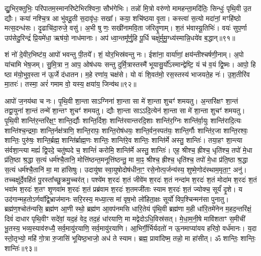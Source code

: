 द्यु॒भिर॒क्तुभिः॒ परि॑पातम॒स्मानरि॑ष्टेभिरश्विना॒ सौभ॑गेभिः। 
तन्नो॑ मि॒त्रो वरु॑णो मामहन्ता॒मदि॑तिः॒ सिन्धुः॑ पृथि॒वी उ॒त द्यौः। 
कया॑ नश्चि॒त्र आ भु॑वदू॒ती स॒दावृ॑धः॒ सखा᳚। 
कया॒ शचि॑ष्ठया वृ॒ता। 
कस्त्वा॑ स॒त्यो मदा॑नां॒ मꣳहि॑ष्ठो मत्स॒दन्ध॑सः। 
दृ॒ढाचि॑दा॒रुजे॒ वसु॑। 
अ॒भी षु णः॒ सखी॑नामवि॒ता ज॑रितॄ॒णाम्। 
श॒तं भ॑वास्यू॒तिभिः॑। 
वयः॑ सुप॒र्णा उप॑सेदु॒रिन्द्रं॑ प्रि॒यमे॑धा॒ ऋष॑यो॒ नाध॑मानाः। 
अप॑ ध्वा॒न्तमू᳚र्णु॒हि पू॒र्धि चक्षु॑र्मुमु॒ग्ध्य॑स्मान्नि॒धये॑व ब॒द्धान्॥९१॥

शं नो॑ दे॒वीर॒भिष्ट॑य॒ आपो॑ भवन्तु पी॒तये᳚। 
शं॒ योर॒भिस्र॑वन्तु नः। 
ईशा॑ना॒ वार्या॑णां॒ क्षय॑न्तीश्चर्\mbox{}षणी॒नाम्। 
अ॒पो या॑चामि भेष॒जम्। 
सु॒मि॒त्रा न॒ आप॒ ओष॑धयः सन्तु दुर्मि॒त्रास्तस्मै॑ भूयासु॒र्यो᳚ऽस्मान्द्वेष्टि॒ यं च॑ व॒यं द्वि॒ष्मः। 
आपो॒ हि ष्ठा म॑यो॒भुव॒स्ता न॑ ऊ॒र्जे द॑धातन। 
म॒हे रणा॑य॒ चक्ष॑से। 
यो वः॑ शि॒वत॑मो॒ रस॒स्तस्य॑ भाजयते॒ह नः॑। 
उ॒श॒तीरि॑व मा॒तरः॑। 
तस्मा॒ अरं॑ गमाम वो॒ यस्य॒ क्षया॑य॒ जिन्व॑थ॥९२॥

आपो॑ ज॒नय॑था च नः। 
पृ॒थि॒वी शा॒न्ता साऽग्निना॑ शा॒न्ता सा मे॑ शा॒न्ता शुचꣳ॑ शमयतु। 
अ॒न्तरि॑क्षꣳ शा॒न्तं तद्वा॒युना॑ शा॒न्तं तन्मे॑ शा॒न्तꣳ शुचꣳ॑ शमयतु। 
द्यौः  शा॒न्ता साऽऽदि॒त्येन॑ शा॒न्ता सा मे॑ शा॒न्ता शुचꣳ॑ शमयतु। 
पृ॒थि॒वी शान्ति॑र॒न्तरि॑क्ष॒ꣳ॒ शान्ति॒र्द्यौः  शान्ति॒र्दिशः॒ शान्ति॑रवान्तरदि॒शाः  शान्ति॑र॒ग्निः  शान्ति॑र्वा॒युः  शान्ति॑रादि॒त्यः  शान्ति॑श्च॒न्द्रमाः॒ शान्ति॒र्नक्ष॑त्राणि॒ शान्ति॒रापः॒ शान्ति॒रोष॑धयः॒ शान्ति॒र्वन॒स्पत॑यः॒ शान्ति॒र्गौः  शान्ति॑र॒जा शान्ति॒रश्वः॒ शान्तिः॒ पुरु॑षः॒ शान्ति॒र्ब्रह्म॒ शान्ति॑र्ब्राह्म॒णः  शान्तिः॒ शान्ति॑रे॒व शान्तिः॒ शान्ति॑र्मे अस्तु॒ शान्तिः॑। 
तया॒हꣳ शा॒न्त्या स॑र्वशा॒न्त्या मह्यं॑ द्वि॒पदे॒ चतु॑ष्पदे च॒ शान्तिं॑ करोमि॒ शान्ति॑र्मे अस्तु॒ शान्तिः॑। 
एह॒ श्रीश्च॒ ह्रीश्च॒ धृति॑श्च॒ तपो॑ मे॒धा प्र॑ति॒ष्ठा श्र॒द्धा स॒त्यं धर्म॑श्चै॒तानि॒ मोत्ति॑ष्ठन्त॒मनूत्ति॑ष्ठन्तु॒ मा मा॒ꣴ॒ श्रीश्च॒ ह्रीश्च॒ धृति॑श्च॒ तपो॑ मे॒धा प्र॑ति॒ष्ठा श्र॒द्धा स॒त्यं धर्म॑श्चै॒तानि॑ मा॒ मा हा॑सिषुः। 
उदायु॑षा स्वा॒युषोदोष॑धीना॒ꣳ॒ रसे॒नोत्प॒र्जन्य॑स्य॒ शुष्मे॒णोद॑स्थाम॒मृता॒ꣳ॒ अनु॑। 
तच्चक्षु॑र्दे॒वहि॑तं पु॒रस्ता᳚च्छु॒क्रमु॒च्चर॑त्। 
पश्ये॑म श॒रदः॑ श॒तं जीवे॑म श॒रदः॑ श॒तं नन्दा॑म श॒रदः॑ श॒तं मोदा॑म श॒रदः॑ श॒तं भवा॑म श॒रदः॑ श॒तꣳ शृ॒णवा॑म श॒रदः॑ श॒तं प्रब्र॑वाम श॒रदः॑ श॒तमजी॑ताः स्याम श॒रदः॑ श॒तं ज्योक्च॒ सूर्यं॑ दृ॒शे। 
य उद॑गान्मह॒तोऽर्णवा᳚द्वि॒भ्राज॑मानः सरि॒रस्य॒ मध्या॒त्स मा॑ वृष॒भो लो॑हिता॒क्षः सूर्यो॑ विप॒श्चिन्मन॑सा पुनातु। 
ब्रह्म॑ण॒श्चोत॑न्यसि॒ ब्रह्म॑ण आ॒णी स्थो॒ ब्रह्म॑ण आ॒वप॑नमसि धारि॒तेयं पृ॑थि॒वी ब्रह्म॑णा म॒ही धा॑रि॒तमे॑नेन म॒हद॒न्तरि॑क्षं॒ दिवं॑ दाधार पृथि॒वीꣳ सदे॑वां॒ यद॒हं वेद॒ तद॒हं धा॑रयाणि॒ मा मद्वेदोऽधि॒विस्र॑सत्। 
मे॒धा॒म॒नी॒षे मावि॑शताꣳ स॒मीची॑ भू॒तस्य॒ भव्य॒स्याव॑रुध्यै॒ सर्व॒मायु॑रयाणि॒ सर्व॒मायु॑रयाणि। 
आ॒भिर्गी॒र्भिर्यदतो॑ न ऊ॒नमाप्या॑यय हरिवो॒ वर्ध॑मानः। 
य॒दा स्तो॒तृभ्यो॒ महि॑ गो॒त्रा रु॒जासि॑ भूयिष्ठ॒भाजो॒ अध॑ ते स्याम। 
ब्रह्म॒ प्रावा॑दिष्म॒ तन्नो॒ मा हा॑सीत्। 
ॐ शान्तिः॒ शान्तिः॒ शान्तिः॑॥९३॥\anuvakamend[प॒रा॒वतो॑ दधातु ब॒द्धां जिन्व॑थ दृ॒शे स॒प्त च॑]

